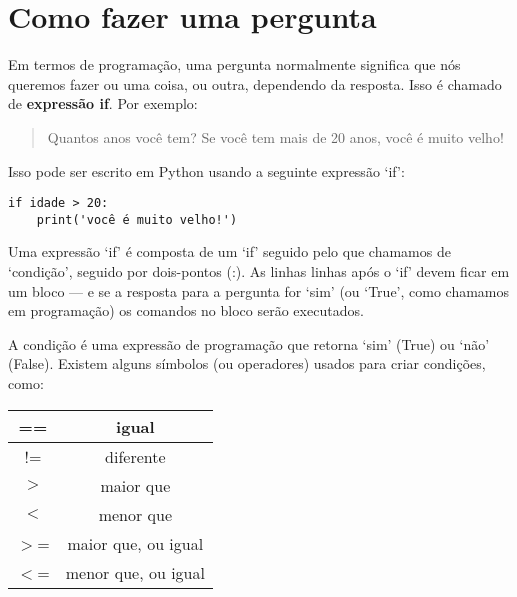 

\chapter{Como fazer uma pergunta}\label{ch:howtoaskaquestion}

Em termos de programação, uma pergunta normalmente significa que nós queremos fazer ou uma coisa, ou outra, dependendo da resposta. Isso é chamado de \textbf{expressão if}. Por exemplo:

\begin{quotation}
Quantos anos você tem? Se você tem mais de 20 anos, você é muito velho!
\end{quotation}

Isso pode ser escrito em Python usando a seguinte expressão `if':

\begin{listing}
\begin{verbatim}
if idade > 20:
    print('você é muito velho!')
\end{verbatim}
\end{listing}

Uma expressão `if' é composta de um `if' seguido pelo que chamamos de `condição', seguido por dois-pontos (:). As linhas linhas após o `if' devem ficar em um bloco --- e se a resposta para a pergunta for `sim' (ou `True', como chamamos em programação) os comandos no bloco serão executados.
\par
A condição é uma expressão de programação que retorna `sim' (True) ou `não' (False). Existem alguns símbolos (ou operadores) usados para criar condições, como:

\begin{center}
\begin{tabular}{|c|c|}
\hline
== & igual \\
\hline
!= & diferente \\
\hline
$>$ & maior que \\
\hline
$<$ & menor que \\
\hline
$>$= & maior que, ou igual \\
\hline
$<$= & menor que, ou igual \\
\hline
\end{tabular}
\end{center}

